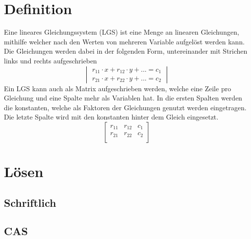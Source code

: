 \documentclass{article}
\begin{document}
\section{Definition}
Eine lineares Gleichungssystem (LGS) ist eine Menge an linearen Gleichungen, mithilfe welcher nach den Werten von mehreren Variable aufgelöst werden kann. Die Gleichungen werden dabei in der folgenden Form, untereinander mit Strichen links und rechts aufgeschrieben
\[
\begin{vmatrix}
 r_{11} \cdot x + r_{12} \cdot y + ... = c_1 \\
 r_{21} \cdot x + r_{22} \cdot y + ... = c_2 
\end{vmatrix}
\] 
Ein LGS kann auch als Matrix aufgeschrieben werden, welche eine Zeile pro Gleichung und eine Spalte mehr als Variablen hat. In die ersten Spalten werden die konstanten, welche als Faktoren der Gleichungen genutzt werden eingetragen. Die letzte Spalte wird mit den konstanten hinter dem Gleich eingesetzt.
\[
\begin{bmatrix}
 r_{11} & r_{12} & c_1 \\
 r_{21} & r_{22} & c_2 \\
\end{bmatrix}
\] 
 
\section{Lösen}
\subsection{Schriftlich}
\subsection{CAS}
 
\end{document}
